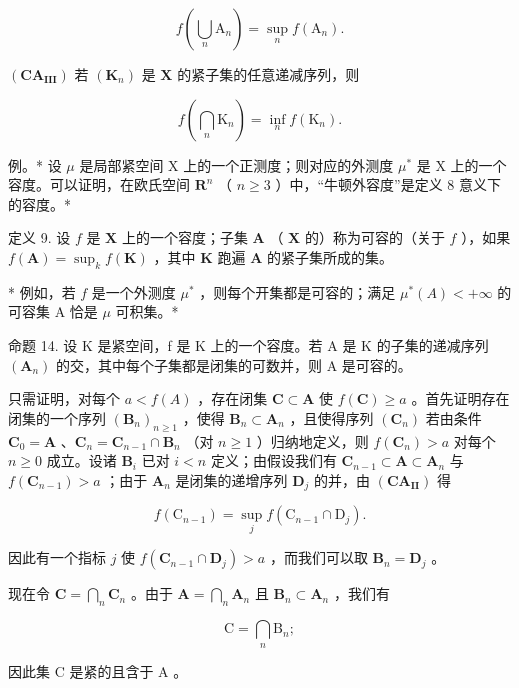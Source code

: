 \[
f \left(\bigcup_ {n} \mathrm{A} _ {n}\right) = \sup _ {n} f (\mathrm{A} _ {n}).
\]

\((\mathbf{CA}_{\mathbf{III}})\) 若 \((\mathbf{K}_n)\) 是 \(\mathbf{X}\) 的紧子集的任意递减序列，则

\[
f \left(\bigcap_ {n} \mathrm{K} _ {n}\right) = \inf _ {n} f (\mathrm{K} _ {n}).
\]

例。* 设 \(\mu\) 是局部紧空间 X 上的一个正测度；则对应的外测度 \(\mu^{*}\) 是 X 上的一个容度。可以证明，在欧氏空间 \(\mathbf{R}^{n}\) （ \(n \geqslant 3\) ）中，“牛顿外容度”是定义 8 意义下的容度。*

定义 9. 设 \(f\) 是 \(\mathbf{X}\) 上的一个容度；子集 \(\mathbf{A}\) （ \(\mathbf{X}\) 的）称为可容的（关于 \(f\) ），如果 \(f(\mathbf{A}) = \sup_k f(\mathbf{K})\) ，其中 \(\mathbf{K}\) 跑遍 \(\mathbf{A}\) 的紧子集所成的集。

* 例如，若 \(f\) 是一个外测度 \(\mu^{*}\) ，则每个开集都是可容的；满足 \(\mu^{*}(A) < +\infty\) 的可容集 A 恰是 \(\mu\) 可积集。*

命题 14. 设 K 是紧空间，f 是 K 上的一个容度。若 A 是 K 的子集的递减序列 \((\mathbf{A}_{n})\) 的交，其中每个子集都是闭集的可数并，则 A 是可容的。

只需证明，对每个 \(a < f(A)\) ，存在闭集 \(\mathbf{C} \subset \mathbf{A}\) 使 \(f(\mathbf{C}) \geqslant a\) 。首先证明存在闭集的一个序列 \((\mathbf{B}_n)_{n \geqslant 1}\) ，使得 \(\mathbf{B}_n \subset \mathbf{A}_n\) ，且使得序列 \((\mathbf{C}_n)\) 若由条件 \(\mathbf{C}_0 = \mathbf{A}\) 、\(\mathbf{C}_n = \mathbf{C}_{n-1} \cap \mathbf{B}_n\) （对 \(n \geqslant 1\) ）归纳地定义，则 \(f(\mathbf{C}_n) > a\) 对每个 \(n \geqslant 0\) 成立。设诸 \(\mathbf{B}_i\) 已对 \(i < n\) 定义；由假设我们有 \(\mathbf{C}_{n-1} \subset \mathbf{A} \subset \mathbf{A}_n\) 与 \(f(\mathbf{C}_{n-1}) > a\) ；由于 \(\mathbf{A}_n\) 是闭集的递增序列 \(\mathbf{D}_j\) 的并，由 \((\mathbf{CA}_{\mathbf{II}})\) 得

\[
f \left(\mathrm{C} _ {n - 1}\right) = \sup _ {j} f \left(\mathrm{C} _ {n - 1} \cap \mathrm{D} _ {j}\right).
\]

因此有一个指标 \(j\) 使 \(f(\mathbf{C}_{n-1} \cap \mathbf{D}_j) > a\) ，而我们可以取 \(\mathbf{B}_n = \mathbf{D}_j\) 。

现在令 \(\mathbf{C} = \bigcap_{n}\mathbf{C}_{n}\) 。由于 \(\mathbf{A} = \bigcap_{n}\mathbf{A}_{n}\) 且 \(\mathbf{B}_n\subset \mathbf{A}_n\) ，我们有

\[
\mathrm{C} = \bigcap_ {n} \mathrm{B} _ {n};
\]

因此集 C 是紧的且含于 A 。

